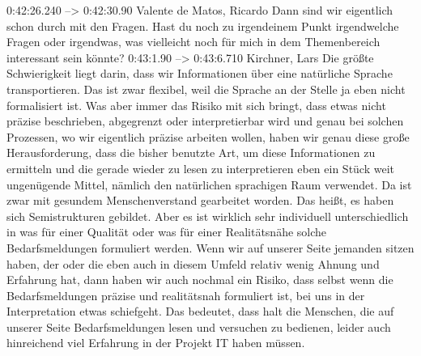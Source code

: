 0:42:26.240 --> 0:42:30.90
Valente de Matos, Ricardo
Dann sind wir eigentlich schon durch mit den Fragen. Hast du noch zu irgendeinem Punkt irgendwelche Fragen oder irgendwas, was vielleicht noch für mich in dem Themenbereich interessant sein könnte?
0:43:1.90 --> 0:43:6.710
Kirchner, Lars
Die größte Schwierigkeit liegt darin, dass wir Informationen über eine natürliche Sprache transportieren. Das ist zwar flexibel, weil die Sprache an der Stelle ja eben nicht formalisiert ist. Was aber immer das Risiko mit sich bringt, dass etwas nicht präzise beschrieben, abgegrenzt oder interpretierbar wird und genau bei solchen Prozessen, wo wir eigentlich präzise arbeiten wollen, haben wir genau diese große Herausforderung, dass die bisher benutzte Art, um diese Informationen zu ermitteln und die gerade wieder zu lesen zu interpretieren eben ein Stück weit ungenügende Mittel, nämlich den natürlichen sprachigen Raum verwendet. Da ist zwar mit gesundem Menschenverstand gearbeitet worden. Das heißt, es haben sich Semistrukturen gebildet. Aber es ist wirklich sehr individuell unterschiedlich in was für einer Qualität oder was für einer Realitätsnähe solche Bedarfsmeldungen formuliert werden. Wenn wir auf unserer Seite jemanden sitzen haben, der oder die eben auch in diesem Umfeld relativ wenig Ahnung und Erfahrung hat, dann haben wir auch nochmal ein Risiko, dass selbst wenn die Bedarfsmeldungen präzise und realitätsnah formuliert ist, bei uns in der Interpretation etwas schiefgeht. Das bedeutet, dass halt die Menschen, die auf unserer Seite Bedarfsmeldungen lesen und versuchen zu bedienen, leider auch hinreichend viel Erfahrung in der Projekt IT haben müssen.

\newpage

